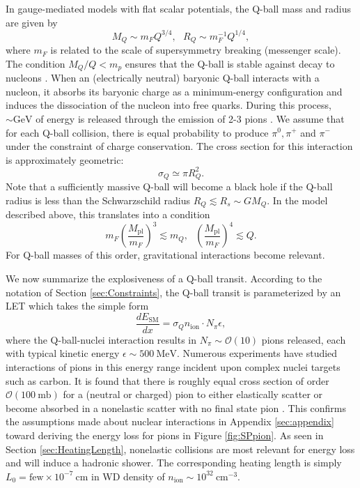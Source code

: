 \documentclass[twocolumn,showpacs,preprintnumbers,amsmath,amssymb,prd]{revtex4}
\newcommand{\OO}{\mathcal{O}}
\newcommand{\Mpl}{M_{\text{pl}}}
\def\r{\right)}
\def\l{\left(}
\begin{document}
In gauge-mediated models with flat scalar potentials, the Q-ball mass and radius are given by
\begin{equation}
\label{eq:Qballprop}
M_Q \sim m_F Q^{3/4}, ~~~ R_Q \sim m_F^{-1} Q^{1/4},
\end{equation}
where $m_F$ is related to the scale of supersymmetry breaking (messenger scale). The condition $M_Q/Q < m_p$ ensures that the Q-ball is stable against decay to nucleons \cite{Dine:2003ax}. When an (electrically neutral) baryonic Q-ball interacts with a nucleon, it absorbs its baryonic charge as a minimum-energy configuration and induces the dissociation of the nucleon into free quarks. During this process, $\sim \text{GeV}$ of energy is released through the emission of 2-3 pions \cite{Dine:2003ax}. We assume that for each Q-ball collision, there is equal probability to produce $\pi^0, \pi^+$ and $\pi^-$ under the constraint of charge conservation. The cross section for this interaction is approximately geometric:
\begin{equation}
\sigma_Q \simeq \pi R_Q^2.
\end{equation}
Note that a sufficiently massive Q-ball will become a black hole if the Q-ball radius is less than the Schwarzschild radius $R_Q \lesssim R_s \sim G M_Q$. In the model described above, this translates into a condition
\begin{equation}
m_F \l\frac{\Mpl}{m_F}\r^3 \lesssim m_Q, ~~~ \l\frac{\Mpl}{m_F}\r^4 \lesssim Q.
\end{equation}
For Q-ball masses of this order, gravitational interactions become relevant.

We now summarize the explosiveness of a Q-ball transit. According to the notation of Section \ref{sec:Constraints}, the Q-ball transit is parameterized by an LET which takes the simple form
\begin{equation}
\frac{d E_\text{SM}}{d x} = \sigma_Q n_\text{ion} \cdot N_\pi \epsilon,
\end{equation}
where the Q-ball-nuclei interaction results in $N_\pi \sim \OO(10)$ pions released, each with typical kinetic energy $\epsilon \sim 500 ~\text{MeV}$. Numerous experiments have studied interactions of pions in this energy range incident upon complex nuclei targets such as carbon. It is found that there is roughly equal cross section of order $\OO (100 ~\text{mb})$ for a (neutral or charged) pion to either elastically scatter or become absorbed in a nonelastic scatter with no final state pion \cite{Pionnuclear}. This confirms the assumptions made about nuclear interactions in Appendix \ref{sec:appendix} toward deriving the energy loss for pions in Figure \ref{fig:SPpion}. As seen in Section \ref{sec:HeatingLength}, nonelastic collisions are most relevant for energy loss and will induce a hadronic shower. The corresponding heating length is simply $L_0 = \text{few} \times 10^{-7} ~\text{cm}$ in WD density of $n_\text{ion} \sim 10^{32} ~\text{cm}^{-3}$. 
\end{document}
